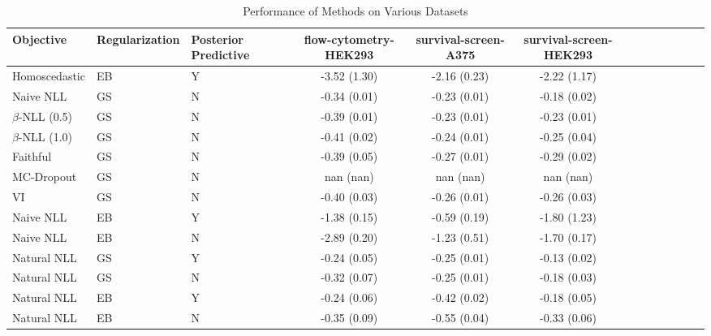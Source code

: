 \begin{table}
\centering
\caption{Performance of Methods on Various Datasets}
\label{tab:results}
\begin{tabular}{|l|l|l|c|c|c|c|c|c|c|c|c|c|}
\toprule
        Objective & Regularization & Posterior Predictive & flow-cytometry-HEK293 & survival-screen-A375 & survival-screen-HEK293 \\
\midrule
    Homoscedastic &             EB &                    Y &          -3.52 (1.30) &         -2.16 (0.23) &           -2.22 (1.17) \\
        Naive NLL &             GS &                    N &          -0.34 (0.01) &         -0.23 (0.01) &           -0.18 (0.02) \\
$\beta$-NLL (0.5) &             GS &                    N &          -0.39 (0.01) &         -0.23 (0.01) &           -0.23 (0.01) \\
$\beta$-NLL (1.0) &             GS &                    N &          -0.41 (0.02) &         -0.24 (0.01) &           -0.25 (0.04) \\
         Faithful &             GS &                    N &          -0.39 (0.05) &         -0.27 (0.01) &           -0.29 (0.02) \\
       MC-Dropout &             GS &                    N &             nan (nan) &            nan (nan) &              nan (nan) \\
               VI &             GS &                    N &          -0.40 (0.03) &         -0.26 (0.01) &           -0.26 (0.03) \\
        Naive NLL &             EB &                    Y &          -1.38 (0.15) &         -0.59 (0.19) &           -1.80 (1.23) \\
        Naive NLL &             EB &                    N &          -2.89 (0.20) &         -1.23 (0.51) &           -1.70 (0.17) \\
      Natural NLL &             GS &                    Y &          -0.24 (0.05) &         -0.25 (0.01) &           -0.13 (0.02) \\
      Natural NLL &             GS &                    N &          -0.32 (0.07) &         -0.25 (0.01) &           -0.18 (0.03) \\
      Natural NLL &             EB &                    Y &          -0.24 (0.06) &         -0.42 (0.02) &           -0.18 (0.05) \\
      Natural NLL &             EB &                    N &          -0.35 (0.09) &         -0.55 (0.04) &           -0.33 (0.06) \\
\bottomrule
\end{tabular}
\end{table}
